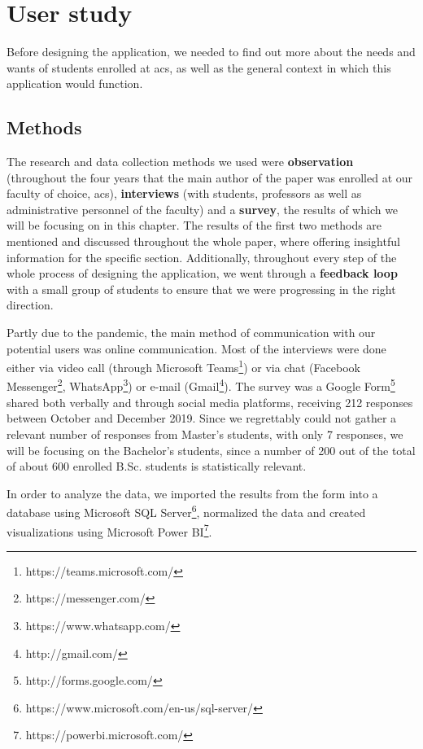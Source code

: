 \chapter{User study} \label{chapter3}

Before designing the application, we needed to find out more about the needs and wants of students enrolled at \acrshort{acs}, as well as the general context in which this application would function.

\section{Methods} \label{3:methods}

The research and data collection methods we used were \textbf{observation} (throughout the four years that the main author of the paper was enrolled at our faculty of choice, \acrshort{acs}), \textbf{interviews} (with students, professors as well as administrative personnel of the faculty) and a \textbf{survey}, the results of which we will be focusing on in this chapter.  The results of the first two methods are mentioned and discussed throughout the whole paper, where offering insightful information for the specific section. Additionally, throughout every step of the whole process of designing the application, we went through a \textbf{feedback loop} with a small group of students to ensure that we were progressing in the right direction.

Partly due to the pandemic, the main method of communication with our potential users was online communication. Most of the interviews were done either via video call (through Microsoft Teams\footnote{https://teams.microsoft.com/}) or via chat (Facebook Messenger\footnote{https://messenger.com/}, WhatsApp\footnote{https://www.whatsapp.com/}) or e-mail (Gmail\footnote{http://gmail.com/}). The survey was a Google Form\footnote{http://forms.google.com/} shared both verbally and through social media platforms, receiving 212 responses between October and December 2019. Since we regrettably could not gather a relevant number of responses from Master's students, with only 7 responses, we will be focusing on the Bachelor's students, since a number of 200 out of the total of about 600 enrolled B.Sc. students is statistically relevant.

In order to analyze the data, we imported the results from the form into a database using Microsoft SQL Server\footnote{https://www.microsoft.com/en-us/sql-server/}, normalized the data and created visualizations using Microsoft Power BI\footnote{https://powerbi.microsoft.com/}.

